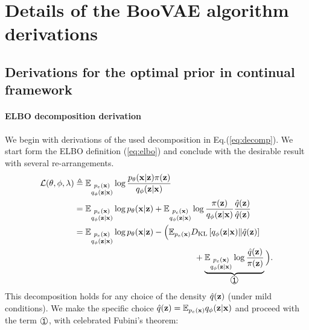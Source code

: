 \section{Details of the BooVAE algorithm derivations}\label{app:algodetails}

\subsection{Derivations for the optimal prior in continual framework}
\label{app:MEPVI}
\paragraph{ELBO decomposition derivation}
We begin with derivations of the used decomposition in Eq.(\ref{eq:decomp}). We start form the ELBO definition (\ref{eq:elbo}) and conclude with the desirable result with several re-arrangements. 
\begin{equation}
\label{eq:app_decomp_begin}
    \begin{aligned}
     \mathcal{L}(\theta, \phi, \lambda) &\triangleq  \E_{\substack{p_{e}(\rvx)\\q_{\phi}(\rvz|\rvx)}}\log \dfrac{p_{\theta}(\rvx|\rvz)\pi(\rvz)}{q_{\phi}(\rvz|\rvx)} \\
   & = \E_{\substack{p_{e}(\rvx)\\q_{\phi}(\rvz|\rvx)}}\log p_{\theta}(\rvx|\rvz) + \E_{\substack{p_{e}(\rvx)\\q_{\phi}(\rvz|\rvx)}}\log\dfrac{\pi(\rvz)}{q_{\phi}(\rvz|\rvx)}\frac{\hat{q}(\rvz)}{\hat{q}(\rvz)} \\
    & = \E_{\substack{p_{e}(\rvx)\\q_{\phi}(\rvz|\rvx)}}\log p_{\theta}(\rvx|\rvz) - \Big(\E_{p_{e}(\rvx)}\KL{q_{\phi}(\rvz|\rvx)}{\hat{q}(\rvz)} \\
   &\hspace{50mm}  +\underbrace{\E_{\substack{p_{e}(\rvx)\\q_{\phi}(\rvz|\rvx)}}\log\dfrac{\hat{q}(\rvz)}{\pi(\rvz)}}_{\raisebox{.5pt}{\textcircled{\raisebox{-.9pt} {\text{\ttfamily 1}}}}}\Big).
    \end{aligned}
\end{equation}
This decomposition holds for any choice of the density $\hat{q}({\mathbf{z}})$ (under mild conditions). We make the specific choice $\hat{q}({\mathbf{z}}) = \mathbb{E}_{p_{e}({\mathbf{x}})}q_{\phi}({\mathbf{z}}|{\mathbf{x}})$ and proceed with the term $\raisebox{.5pt}{\textcircled{\raisebox{-.9pt} {\text{\ttfamily 1}}}}$, with celebrated Fubini's theorem:
